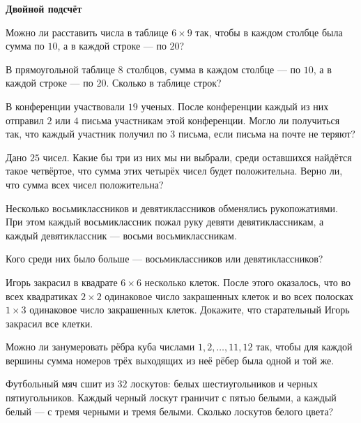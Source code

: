 \documentclass{article}
\begin{document}
    \large

    \begin{center}
        \textbf{Двойной подсчёт}
    \end{center}

    \begin{enumerate_boxed}

        \item Можно ли расставить числа в таблице $6 \times 9$ так, чтобы в каждом столбце была сумма по $10$, а в каждой строке — по $20$?

        \item В прямоугольной таблице $8$ столбцов, сумма в каждом столбце — по $10$, а в каждой строке — по $20$.
        Сколько в таблице строк?

        \item В конференции участвовали $19$ ученых.
        После конференции каждый из них отправил $2$ или $4$ письма участникам этой конференции.
        Могло ли получиться так, что каждый участник получил по $3$ письма, если письма на почте не теряют?

        \item Дано $25$ чисел.
        Какие бы три из них мы ни выбрали, среди оставшихся найдётся такое четвёртое, что сумма этих четырёх чисел будет положительна.
        Верно ли, что сумма всех чисел положительна?

        \item Несколько восьмиклассников и девятиклассников обменялись рукопожатиями.
        При этом каждый восьмиклассник пожал руку девяти девятиклассникам, а каждый девятиклассник — восьми восьмиклассникам.

        Кого среди них было больше — восьмиклассников или девятиклассников?

        \item Игорь закрасил в квадрате $6 \times 6$ несколько клеток.
        После этого оказалось, что во всех квадратиках $2 \times 2$ одинаковое число закрашенных клеток и во всех полосках $1 \times 3$ одинаковое число закрашенных клеток.
        Докажите, что старательный Игорь закрасил все клетки.

        \item Можно ли занумеровать рёбра куба числами $1, 2, \dotsc, 11, 12$ так, чтобы для каждой вершины сумма номеров трёх выходящих из неё рёбер была одной и той же.

        \item Футбольный мяч сшит из $32$ лоскутов: белых шестиугольников и черных пятиугольников.
        Каждый черный лоскут граничит с пятью белыми, а каждый белый — с тремя черными и тремя белыми.
        Сколько лоскутов белого цвета?


\end{enumerate_boxed}
\end{document}
